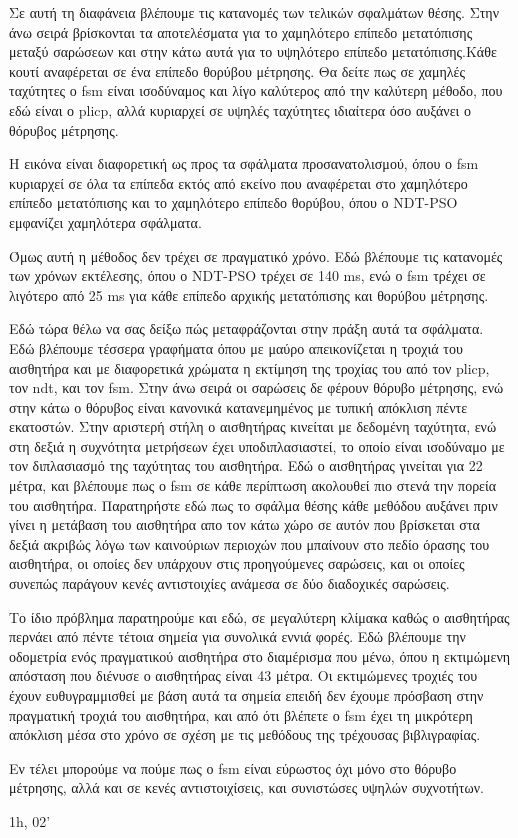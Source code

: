 \documentclass[a4paper,10pt]{article}
\begin{document}
Σε αυτή τη διαφάνεια βλέπουμε τις κατανομές των τελικών σφαλμάτων θέσης. Στην
άνω σειρά βρίσκονται τα αποτελέσματα για το χαμηλότερο επίπεδο μετατόπισης
μεταξύ σαρώσεων και στην κάτω αυτά για το υψηλότερο επίπεδο μετατόπισης.Κάθε
κουτί αναφέρεται σε ένα επίπεδο θορύβου μέτρησης. Θα δείτε πως σε χαμηλές
ταχύτητες ο fsm είναι ισοδύναμος και λίγο καλύτερος από την καλύτερη μέθοδο,
που εδώ είναι ο plicp, αλλά κυριαρχεί σε υψηλές ταχύτητες ιδιαίτερα όσο αυξάνει
ο θόρυβος μέτρησης.

Η εικόνα είναι διαφορετική ως προς τα σφάλματα προσανατολισμού, όπου ο fsm
κυριαρχεί σε όλα τα επίπεδα εκτός από εκείνο που αναφέρεται στο χαμηλότερο
επίπεδο μετατόπισης και το χαμηλότερο επίπεδο θορύβου, όπου ο NDT-PSO εμφανίζει
χαμηλότερα σφάλματα.

Όμως αυτή η μέθοδος δεν τρέχει σε πραγματικό χρόνο. Εδώ βλέπουμε τις κατανομές
των χρόνων εκτέλεσης, όπου ο NDT-PSO τρέχει σε 140 ms, ενώ ο fsm τρέχει σε
λιγότερο από 25 ms για κάθε επίπεδο αρχικής μετατόπισης και θορύβου μέτρησης.

Εδώ τώρα θέλω να σας δείξω πώς μεταφράζονται στην πράξη αυτά τα σφάλματα. Εδώ
βλέπουμε τέσσερα γραφήματα όπου με μαύρο απεικονίζεται η τροχιά του αισθητήρα
και με διαφορετικά χρώματα η εκτίμηση της τροχίας του από τον plicp, τον ndt,
και τον fsm. Στην άνω σειρά οι σαρώσεις δε φέρουν θόρυβο μέτρησης, ενώ στην
κάτω ο θόρυβος είναι κανονικά κατανεμημένος με τυπική απόκλιση πέντε εκατοστών.
Στην αριστερή στήλη ο αισθητήρας κινείται με δεδομένη ταχύτητα, ενώ στη δεξιά η
συχνότητα μετρήσεων έχει υποδιπλασιαστεί, το οποίο είναι ισοδύναμο με τον
διπλασιασμό της ταχύτητας του αισθητήρα. Εδώ ο αισθητήρας γινείται για 22
μέτρα, και βλέπουμε πως ο fsm σε κάθε περίπτωση ακολουθεί πιο στενά την πορεία
του αισθητήρα. Παρατηρήστε εδώ πως το σφάλμα θέσης κάθε μεθόδου αυξάνει πριν
γίνει η μετάβαση του αισθητήρα απο τον κάτω χώρο σε αυτόν που βρίσκεται στα
δεξιά ακριβώς λόγω των καινούριων περιοχών που μπαίνουν στο πεδίο όρασης του
αισθητήρα, οι οποίες δεν υπάρχουν στις προηγούμενες σαρώσεις, και οι οποίες
συνεπώς παράγουν κενές αντιστοιχίες ανάμεσα σε δύο διαδοχικές σαρώσεις.

Το ίδιο πρόβλημα παρατηρούμε και εδώ, σε μεγαλύτερη κλίμακα καθώς ο αισθητήρας
περνάει από πέντε τέτοια σημεία για συνολικά εννιά φορές. Εδώ βλέπουμε την
οδομετρία ενός πραγματικού αισθητήρα στο διαμέρισμα που μένω, όπου η εκτιμώμενη
απόσταση που διένυσε ο αισθητήρας είναι 43 μέτρα. Οι εκτιμώμενες τροχιές του
έχουν ευθυγραμμισθεί με βάση αυτά τα σημεία επειδή δεν έχουμε πρόσβαση στην
πραγματική τροχιά του αισθητήρα, και από ότι βλέπετε ο fsm έχει τη μικρότερη
απόκλιση μέσα στο χρόνο σε σχέση με τις μεθόδους της τρέχουσας βιβλιγραφίας.

Εν τέλει μπορούμε να πούμε πως ο fsm είναι εύρωστος όχι μόνο στο θόρυβο
μέτρησης, αλλά και σε κενές αντιστοιχίσεις, και συνιστώσες υψηλών συχνοτήτων.


1h, 02'
\end{document}
